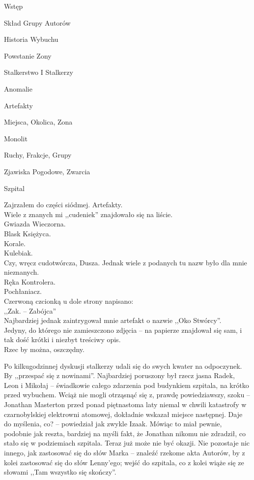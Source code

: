 \documentclass[../MAIN.tex]{subfiles}
\begin{document}
% 
\begin{compactenum}
\item Wstęp
\item Skład Grupy Autorów
\item Historia Wybuchu
\item Powstanie Zony
\item Stalkerstwo I Stalkerzy
\item Anomalie
\item Artefakty
\item Miejsca, Okolica, Zona
\item Monolit
\item Ruchy, Frakcje, Grupy
\item Zjawiska Pogodowe, Zwarcia
\item Szpital
\end{compactenum}

Zajrzałem do części siódmej. Artefakty.\\
Wiele z znanych mi ,,cudeniek'' znajdowało się na liście.\\
Gwiazda Wieczorna.\\
Blask Księżyca.\\
Korale.\\
Kulebiak.\\
Czy, wręcz cudotwórcza, Dusza. Jednak wiele z podanych tu nazw było dla mnie nieznanych.\\
Ręka Kontrolera.\\
Pochłaniacz.\\
Czerwoną czcionką u dole strony napisano:\\
,,Zak. -- Zabójca''\\
Najbardziej jednak zaintrygował mnie artefakt o nazwie ,,Oko Stwórcy''.\\ Jedyny, do którego nie zamieszczono zdjęcia -- na papierze znajdował się sam, i tak dość krótki i niezbyt treściwy opis.\\
Rzec by można, oszczędny.

Po kilkugodzinnej dyskusji stalkerzy udali się do swych kwater na odpoczynek. By ,,przespać się z nowinami''. Najbardziej poruszony był rzecz jasna Radek, Leon i Mikołaj -- świadkowie całego zdarzenia pod budynkiem szpitala, na krótko przed wybuchem. Wciąż nie mogli otrząsnąć się z, prawdę powiedziawszy, szoku -- Jonathan Masterton przed ponad piętnastoma laty niemal w chwili katastrofy w czarnobylskiej elektrowni atomowej, dokładnie wskazał miejsce następnej.
\sx Daje do myślenia, co? -- powiedział jak zwykle Izaak.
\qd
Mówiąc to miał pewnie, podobnie jak reszta, bardziej na myśli fakt, że Jonathan nikomu nie zdradził, co stało się w podziemiach szpitala. Teraz już może nie być okazji.
Nie pozostaje  nic innego, jak zastosować się do słów Marka -- znaleźć rzekome akta Autorów, by z kolei zastosować się do słów Lenny’ego; wejść do szpitala, co z kolei wiąże się ze słowami ,,Tam wszystko się skończy''.
\end{document}
